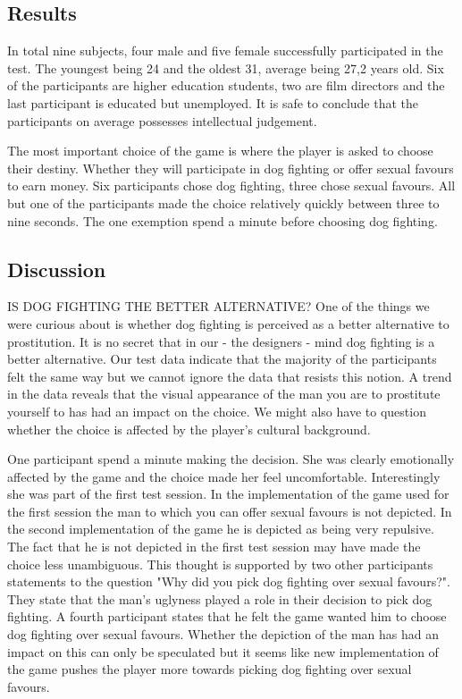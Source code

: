 \subsection{Results}

In total nine subjects, four male and five female successfully participated in the test. The youngest being 24 and the oldest 31, average being 27,2 years old. Six of the participants are higher education students, two are film directors and the last participant is educated but unemployed. It is safe to conclude that the participants on average possesses intellectual judgement.

The most important choice of the game is where the player is asked to choose their destiny. Whether they will participate in dog fighting or offer sexual favours to earn money. Six participants chose dog fighting, three chose sexual favours. All but one of the participants made the choice relatively quickly between three to nine seconds. The one exemption spend a minute before choosing dog fighting.

\subsection{Discussion}
IS DOG FIGHTING THE BETTER ALTERNATIVE?
One of the things we were curious about is whether dog fighting is perceived as a better alternative to prostitution. It is no secret that in our - the designers - mind dog fighting is a better alternative. Our test data indicate that the majority of the participants felt the same way but we cannot ignore the data that resists this notion. A trend in the data reveals that the visual appearance of the man you are to prostitute yourself to has had an impact on the choice. We might also have to question whether the choice is affected by the player's cultural background.

One participant spend a minute making the decision. She was clearly emotionally affected by the game and the choice made her feel uncomfortable. Interestingly she was part of the first test session. In the implementation of the game used for the first session the man to which you can offer sexual favours is not depicted. In the second implementation of the game he is depicted as being very repulsive.   The fact that he is not depicted in the first test session may have made the choice less unambiguous. This thought is supported by two other participants statements to the question "Why did you pick dog fighting over sexual favours?". They state that the man's uglyness played a role in their decision to pick dog fighting. A fourth participant  states that he felt the game wanted him to choose dog fighting over sexual favours. Whether the depiction of the man has had an impact on this can only be speculated but it seems like new implementation of the game pushes the player more towards picking dog fighting over sexual favours.


